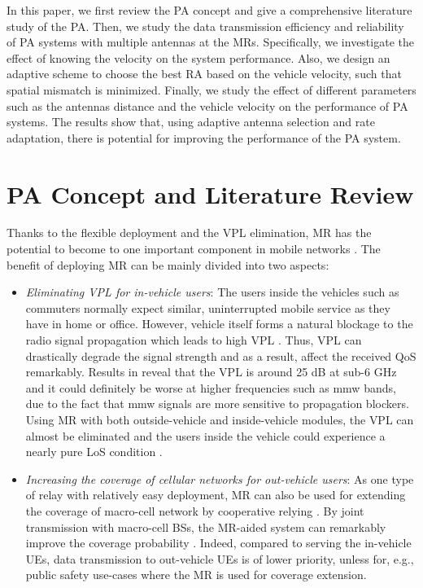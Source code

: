\documentclass[conference]{IEEEtran}
\begin{document}
In this paper, we first review the \ac{PA} concept and give a comprehensive literature study of the \ac{PA}. Then, we study the data transmission efficiency and reliability of \ac{PA} systems with multiple antennas at the \acp{MR}. Specifically, we investigate the effect of knowing the velocity on the system performance. Also, we design an adaptive scheme to choose the best \ac{RA} based on the vehicle velocity, such that spatial mismatch is minimized. Finally, we study the effect of different parameters such as the antennas distance and the vehicle velocity on the performance of \ac{PA} systems.  The results show that, using adaptive antenna selection and rate adaptation, there is potential for improving the performance of the \ac{PA} system.


\section{PA Concept and Literature Review}
Thanks to the flexible deployment and the \ac{VPL} elimination, \ac{MR} has the potential to become to one important component in mobile networks \cite{yutao2013moving,guo2021predictor,shan2021CST}. The benefit of deploying \ac{MR} can be mainly divided into two aspects:
\begin{itemize}
    \item{\textit{Eliminating \ac{VPL} for in-vehicle users}}: The users inside the vehicles such as commuters  normally expect similar, uninterrupted mobile service as they have in home or office. However, vehicle itself forms a natural blockage to the radio signal propagation which leads to high \ac{VPL} \cite{tanghe2008TVT}. Thus, \ac{VPL} can drastically degrade the signal strength and as a result, affect the received \ac{QoS} remarkably. Results in \cite{tanghe2008TVT} reveal that the \ac{VPL} is around 25 dB at sub-6 GHz and it could definitely be worse at higher frequencies such as \ac{mmw} bands, due to the fact that \ac{mmw} signals are more sensitive to propagation blockers. Using \ac{MR} with both outside-vehicle and inside-vehicle modules, the \ac{VPL} can almost be eliminated and the users inside the vehicle could experience a nearly pure \ac{LoS} condition \cite{yutao2013moving}.
    \item{\textit{Increasing the coverage of cellular networks for out-vehicle users}}: As one type of relay with relatively easy deployment, \ac{MR} can also be used for extending the coverage of macro-cell network by cooperative relying \cite{li2012tvt,khan2017tvt}. By joint transmission with macro-cell \acp{BS}, the \ac{MR}-aided system can remarkably improve the coverage probability \cite{li2012tvt}. Indeed, compared to serving the in-vehicle \acp{UE}, data transmission to out-vehicle \acp{UE} is of lower priority, unless for, e.g., public safety use-cases where the \ac{MR} is used for coverage extension.
\end{itemize}
\end{document}

